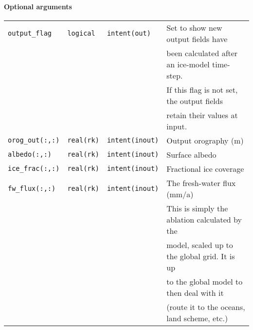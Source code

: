 \documentclass[11pt]{article}
\begin{document}
\paragraph{Optional arguments}
%
\begin{center}
\begin{tabular}{llll}
\texttt{output\_flag} & \texttt{logical} & \texttt{intent(out)} & Set to show
new output fields have \\
 & & & been calculated after an ice-model time-step. \\
 & & & If this flag is not set, the output fields \\
 & & & retain their values at input. \\
\texttt{orog\_out(:,:)} & \texttt{real(rk)} & \texttt{intent(inout)} & Output
orography (m)\\ 
\texttt{albedo(:,:)} & \texttt{real(rk)} & \texttt{intent(inout)} & Surface
albedo \\
\texttt{ice\_frac(:,:)} & \texttt{real(rk)} & \texttt{intent(inout)} &
Fractional ice coverage \\
\texttt{fw\_flux(:,:)} & \texttt{real(rk)} & \texttt{intent(inout)} & The
fresh-water flux (mm/a) \\
 & & & This is simply the ablation calculated by the \\
 & & & model, scaled up to the global grid. It is up \\
 & & & to the global model to then  deal with it \\
 & & & (route it to the oceans, land scheme, etc.) \\
\end{tabular}
\end{center}
\end{document}

